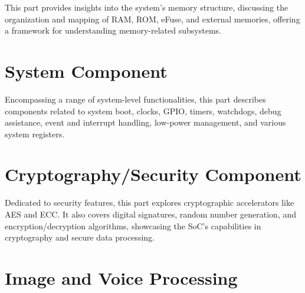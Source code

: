 \documentclass[openany, 10pt]{book}
\begin{document}
This part provides insights into the system's memory structure, discussing the organization and mapping of RAM, ROM, eFuse, and external memories, offering a framework for understanding memory-related subsystems.


\part{System Component}


Encompassing a range of system-level functionalities, this part describes components related to system boot, clocks, GPIO, timers, watchdogs, debug assistance, event and interrupt handling, low-power management, and various system registers.


\part{Cryptography/Security Component}

Dedicated to security features, this part explores cryptographic accelerators like AES and ECC. It also covers digital signatures, random number generation, and encryption/decryption algorithms, showcasing the SoC's capabilities in cryptography and secure data processing.



\part{Image and Voice Processing}
\end{document}
